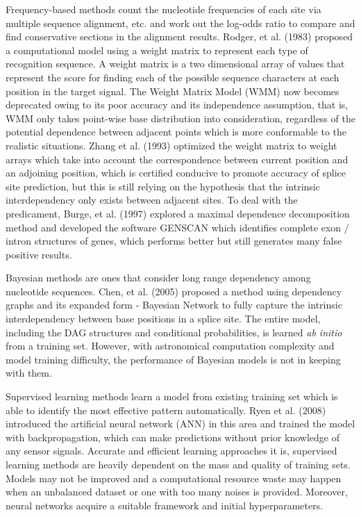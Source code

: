 \documentclass[journal,twoside]{IEEEtran}
\begin{document}
Frequency-based methods count the nucleotide frequencies of each site via multiple sequence alignment, etc. and work out the log-odds ratio to compare and find conservative sections in the alignment results. Rodger, et al. (1983) \cite{staden1984computer} proposed a computational model using a weight matrix to represent each type of recognition sequence. A weight matrix is a two dimensional array of values that represent the score for finding each of the possible sequence characters at each position in the target signal. The Weight Matrix Model (WMM) now becomes deprecated owing to its poor accuracy and its independence assumption, that is, WMM only takes point-wise base distribution into consideration, regardless of the potential dependence between adjacent points which is more conformable to the realistic situations. Zhang et al. (1993) \cite{zhang1993weight} optimized the weight matrix to weight arrays which take into account the correspondence between current position and an adjoining position, which is certified conducive to promote accuracy of splice site prediction, but this is still relying on the hypothesis that the intrinsic interdependency only exists between adjacent sites. To deal with the predicament, Burge, et al. (1997) \cite{burge1997prediction} explored a maximal dependence decomposition method and developed the software GENSCAN which identifies complete exon / intron structures of genes, which performs better but still generates many false positive results. 

Bayesian methods are ones that consider long range dependency among nucleotide sequences. Chen, et al. (2005) \cite{chen2005prediction} proposed a method using dependency graphs and its expanded form - Bayesian Network to fully capture the intrinsic interdependency between base positions in a splice site. The entire model, including the DAG structures and conditional probabilities, is learned \textsl{ab initio} from a training set. However, with astronomical computation complexity and model training difficulty, the performance of Bayesian models is not in keeping with them. 

Supervised learning methods learn a model from existing training set which is able to identify the most effective pattern automatically. Ryen et al. (2008) \cite{ryen2008splice} introduced the artificial neural network (ANN) in this area and trained the model with backpropagation, which can make predictions without prior knowledge of any sensor signals. Accurate and efficient learning approaches it is, supervised learning methods are heavily dependent on the mass and quality of training sets. Models may not be improved and a computational resource waste may happen when an unbalanced dataset or one with too many noises is provided. Moreover, neural networks acquire a suitable framework and initial hyperparameters. 
\end{document}
